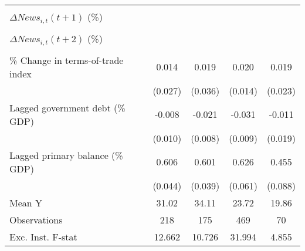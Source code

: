 {\begin{tabular}{l*{4}{c}}
                    &                     &                     &                     &                     \\
\addlinespace
$ \Delta News_{i,t}(t+1)$ (\%)&                     &                     &                     &                     \\
                    &                     &                     &                     &                     \\
\addlinespace
$ \Delta News_{i,t}(t+2)$ (\%)&                     &                     &                     &                     \\
                    &                     &                     &                     &                     \\
\addlinespace
\% Change in terms-of-trade index&       0.014         &       0.019         &       0.020         &       0.019         \\
                    &     (0.027)         &     (0.036)         &     (0.014)         &     (0.023)         \\
\addlinespace
Lagged government debt (\% GDP)&      -0.008         &      -0.021\sym{***}&      -0.031\sym{***}&      -0.011         \\
                    &     (0.010)         &     (0.008)         &     (0.009)         &     (0.019)         \\
\addlinespace
Lagged primary balance (\% GDP)&       0.606\sym{***}&       0.601\sym{***}&       0.626\sym{***}&       0.455\sym{***}\\
                    &     (0.044)         &     (0.039)         &     (0.061)         &     (0.088)         \\
\midrule
Mean Y              &       31.02         &       34.11         &       23.72         &       19.86         \\
Observations        &         218         &         175         &         469         &          70         \\
Exc. Inst. F-stat   &      12.662         &      10.726         &      31.994         &       4.855         \\
\bottomrule
\end{tabular}
}
